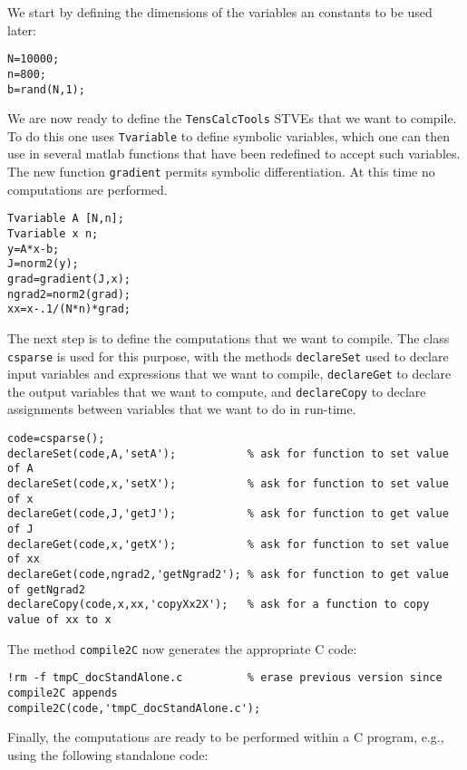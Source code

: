 \documentclass[11pt]{article}
\newcommand{\TC}{\texttt{TensCalcTools}}
\begin{document}
\medskip

We start by defining the dimensions of the variables an constants to
be used later:
\begin{lstlisting}
N=10000;
n=800;
b=rand(N,1);
\end{lstlisting}
We are now ready to define the \TC{} STVEs that we want to compile. To
do this one uses \lstinline{Tvariable} to define symbolic variables,
which one can then use in several matlab functions that have been
redefined to accept such variables. The new function
\lstinline{gradient} permits symbolic differentiation. At this time no
computations are performed.
\begin{lstlisting}
Tvariable A [N,n];
Tvariable x n;
y=A*x-b;
J=norm2(y);
grad=gradient(J,x);
ngrad2=norm2(grad);
xx=x-.1/(N*n)*grad;
\end{lstlisting}
The next step is to define the computations that we want to
compile. The class \lstinline{csparse} is used for this purpose, with
the methods \lstinline{declareSet} used to declare input variables and
expressions that we want to compile, \lstinline{declareGet} to declare
the output variables that we want to compute, and
\lstinline{declareCopy} to declare assignments between variables that
we want to do in run-time. 
\begin{lstlisting}
code=csparse();
declareSet(code,A,'setA');           % ask for function to set value of A
declareSet(code,x,'setX');           % ask for function to set value of x
declareGet(code,J,'getJ');           % ask for function to get value of J
declareGet(code,x,'getX');           % ask for function to set value of xx
declareGet(code,ngrad2,'getNgrad2'); % ask for function to get value of getNgrad2
declareCopy(code,x,xx,'copyXx2X');   % ask for a function to copy value of xx to x
\end{lstlisting}
The method \lstinline{compile2C} now generates the appropriate C code:
\begin{lstlisting}
!rm -f tmpC_docStandAlone.c          % erase previous version since compile2C appends
compile2C(code,'tmpC_docStandAlone.c');
\end{lstlisting}
Finally, the computations are ready to be performed within a C
program, e.g., using the following standalone code:
\end{document}
